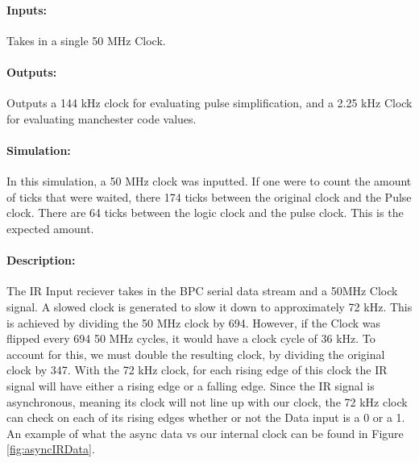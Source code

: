 \documentclass[]{article}
\begin{document}
\paragraph{Inputs:} Takes in a single 50 MHz Clock.
\paragraph{Outputs:} Outputs a 144 kHz clock for evaluating pulse simplification, and a 2.25 kHz Clock for evaluating manchester code values.
\paragraph{Simulation:} In this simulation, a 50 MHz clock was inputted. If one were to count the amount of ticks that were waited, there 174 ticks between the original clock and the Pulse clock. There are 64 ticks between the logic clock and the pulse clock. This is the expected amount. 
\paragraph{Description:} The IR Input reciever takes in the BPC serial data stream and a 50MHz Clock signal. A slowed clock is generated to slow it down to approximately 72 kHz.
This is achieved by dividing the 50 MHz clock by 694. However, if the Clock was flipped every 694 50 MHz cycles, it would have a clock cycle of 36 kHz. 
To account for this, we must double the resulting clock, by dividing the original clock by 347.
With the 72 kHz clock, for each rising edge of this clock the IR signal will have either a rising edge or a falling edge. 
Since the IR signal is asynchronous, meaning its clock will not line up with our clock, the 72 kHz clock can check on each of its rising edges whether or not the Data input is a 0 or a 1.
An example of what the async data vs our internal clock can be found in Figure \ref{fig:asyncIRData}.
\end{document}
